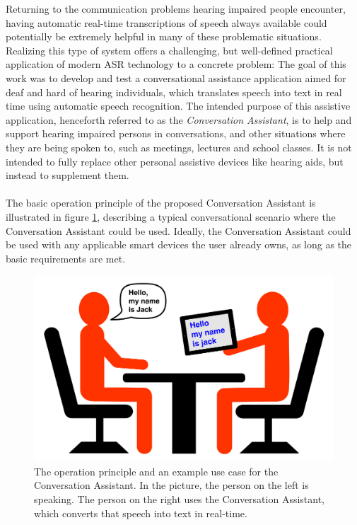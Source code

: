 \documentclass[english, 12pt, a4paper, pdftex, elec, utf8]{aaltothesis}
\begin{document}
Returning to the communication problems hearing impaired people encounter, having automatic real-time transcriptions of speech always available could potentially be extremely helpful in many of these problematic situations. Realizing this type of system offers a challenging, but well-defined practical application of modern ASR technology to a concrete problem: The goal of this work was to develop and test a conversational assistance application aimed for deaf and hard of hearing individuals, which translates speech into text in real time using automatic speech recognition. The intended purpose of this assistive application, henceforth referred to as the \textit{Conversation Assistant}, is to help and support hearing impaired persons in conversations, and other situations where they are being spoken to, such as meetings, lectures and school classes. It is not intended to fully replace other personal assistive devices like hearing aids, but instead to supplement them. \\\\
The basic operation principle of the proposed Conversation Assistant is illustrated in figure \ref{fig:assistant}, describing a typical conversational scenario where the Conversation Assistant could be used. Ideally, the Conversation Assistant could be used with any applicable smart devices the user already owns, as long as the basic requirements are met. \\
\begin{figure}[b]
	\centering 
	\includegraphics[trim={0cm 0cm 0cm 0cm}, clip, width=\textwidth]{assistant3.pdf}
	\caption{The operation principle and an example use case for the Conversation Assistant. In the picture, the person on the left is speaking. The person on the right uses the Conversation Assistant, which converts that speech into text in real-time.}
	\label{fig:assistant} 
\end{figure} 
\end{document}
